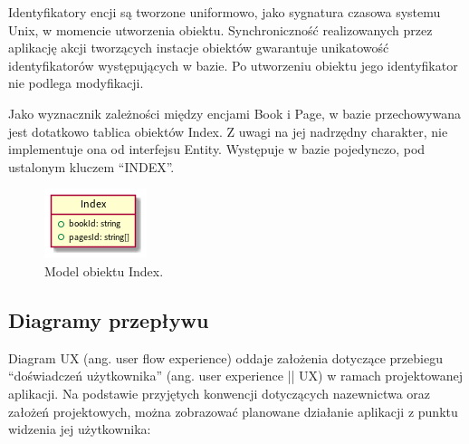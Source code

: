 Identyfikatory encji są tworzone uniformowo, jako sygnatura czasowa systemu Unix, w momencie utworzenia obiektu.
Synchroniczność realizowanych przez aplikację akcji tworzących instacje obiektów gwarantuje unikatowość identyfikatorów
występujących w bazie.
Po utworzeniu obiektu jego identyfikator nie podlega modyfikacji.

Jako wyznacznik zależności między encjami Book i Page, w bazie przechowywana jest dotatkowo tablica obiektów Index.
Z uwagi na jej nadrzędny charakter, nie implementuje ona od interfejsu Entity. Występuje w bazie pojedynczo, pod ustalonym
kluczem \enquote{INDEX}.

\begin{figure}[H]
	\begin{center}
		\includegraphics[scale=0.9]{media/Index.png}
	\end{center}
	\caption{Model obiektu Index.}
	\label{rys:index}
\end{figure}

\subsection{Diagramy przepływu}
Diagram UX (ang. user flow experience) oddaje założenia dotyczące przebiegu \enquote{doświadczeń użytkownika} (ang. user experience || UX)
w ramach projektowanej aplikacji. Na podstawie przyjętych konwencji dotyczących nazewnictwa oraz założeń projektowych,
można zobrazować planowane działanie aplikacji z punktu widzenia jej użytkownika:

